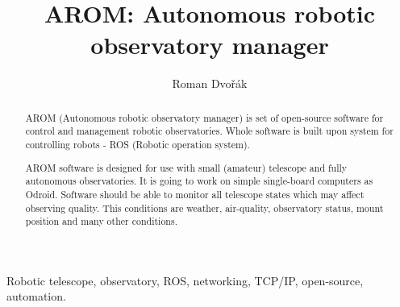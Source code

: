 \documentclass{poster16}
\begin{document}

%
\title{AROM: Autonomous robotic observatory manager}
%

%
\author{Roman Dvořák}
%


\maketitle


\begin{abstract}

AROM (Autonomous robotic observatory manager) is set of open-source software for control and management robotic observatories. Whole software is built upon system for controlling robots - ROS (Robotic operation system). 

AROM software is designed for use with small (amateur) telescope and fully autonomous observatories. It is going to work on simple single-board computers as Odroid. Software should be able to monitor all telescope states which may affect observing quality. This conditions are weather, air-quality, observatory status, mount position and many other conditions.
\end{abstract}


\begin{keywords}
Robotic telescope, observatory, ROS, networking, TCP/IP, open-source, automation.
\end{keywords}
\end{document}

